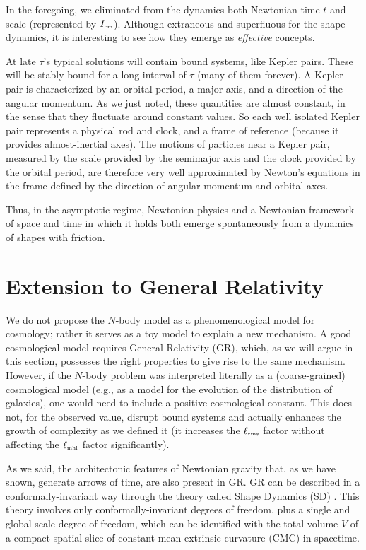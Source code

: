 \documentclass[prl,nofootinbib,twocolumn,superscriptaddress]{revtex4}
\newcommand{\st}[1]{\text{\tiny \rm #1}}
\begin{document}
In the foregoing, we eliminated from the dynamics both Newtonian time $t$ and
scale (represented by $I_\st{cm}$). Although extraneous and superfluous for the
shape dynamics, it is interesting to see how they emerge as {\it effective} concepts.

At late $\tau$'s typical solutions will contain bound systems, like Kepler pairs.
These will be stably bound for a long interval of $\tau$ (many of them forever).
A Kepler pair is characterized by an orbital period, a major axis, and a direction of the  angular momentum. As we just noted, these quantities are almost constant, in the sense that they 
fluctuate around constant values. So each well isolated Kepler pair represents
a physical rod and clock, and a frame of reference (because it provides almost-inertial
axes). The motions of particles near a Kepler pair, measured by the scale provided
by the semimajor axis and the clock provided by the orbital period, are therefore very well approximated by Newton's equations in the frame defined
by the direction of angular momentum and orbital axes.

Thus, in the asymptotic regime, Newtonian physics and a Newtonian framework of space and time in which it holds both emerge spontaneously from a dynamics of shapes with friction.


\section{Extension to General Relativity}

We do not propose the $N$-body model as a phenomenological
model for cosmology; rather it serves as a  toy model to explain a new mechanism. A good cosmological model requires
General Relativity (GR), which, as we will argue in this section, possesses the right properties to give rise to the same mechanism.
However, if the $N$-body problem was interpreted literally as a (coarse-grained) cosmological model (e.g., as a model for the evolution of the distribution of galaxies), one would need to include a positive
cosmological constant. This does not, for the observed value, disrupt bound systems and actually enhances the growth of complexity as we defined it (it increases the $\ell_\st{rms}$ factor without affecting the $\ell_\st{mhl}$ factor significantly).

As we said, the architectonic features of Newtonian gravity that, as we have shown, generate arrows of time, are also present in GR.  GR can be described in a conformally-invariant way through the theory called Shape Dynamics (SD) \cite{gryb:shape_dyn,FlaviosSDtutorial}. This theory involves only conformally-invariant degrees of freedom, plus a single and global scale degree of freedom, which can be identified with the total volume $V$ of a compact spatial slice of constant mean extrinsic curvature (CMC) in spacetime.
\end{document}
